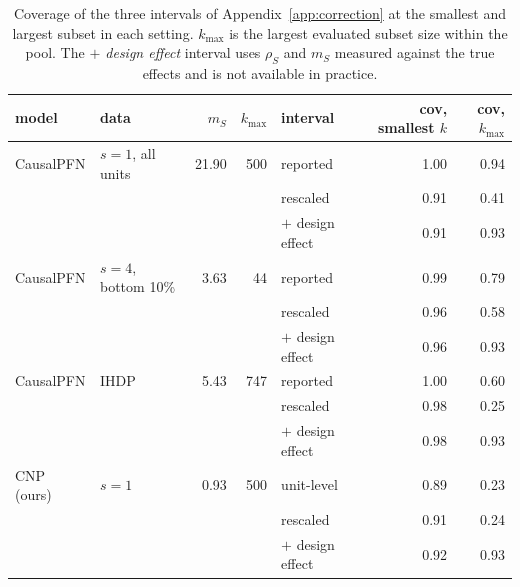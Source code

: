\begin{table}[tp]
\centering
\footnotesize
\setlength{\tabcolsep}{5pt}
\begin{tabular}{llrrlrr}
\toprule
\textbf{model} & \textbf{data} & \textbf{$m_S$} & \textbf{$k_{\max}$} & \textbf{interval} & \textbf{cov, smallest $k$} & \textbf{cov, $k_{\max}$} \\
\midrule
CausalPFN & $s=1$, all units & 21.90 & 500 & reported & 1.00 & 0.94 \\
 &  &  &  & rescaled & 0.91 & 0.41 \\
 &  &  &  & $+$ design effect & 0.91 & 0.93 \\
\addlinespace[2pt]
CausalPFN & $s=4$, bottom 10\% & 3.63 & 44 & reported & 0.99 & 0.79 \\
 &  &  &  & rescaled & 0.96 & 0.58 \\
 &  &  &  & $+$ design effect & 0.96 & 0.93 \\
\addlinespace[2pt]
CausalPFN & IHDP & 5.43 & 747 & reported & 1.00 & 0.60 \\
 &  &  &  & rescaled & 0.98 & 0.25 \\
 &  &  &  & $+$ design effect & 0.98 & 0.93 \\
\addlinespace[2pt]
CNP (ours) & $s=1$ & 0.93 & 500 & unit-level & 0.89 & 0.23 \\
 &  &  &  & rescaled & 0.91 & 0.24 \\
 &  &  &  & $+$ design effect & 0.92 & 0.93 \\
\bottomrule
\end{tabular}
\caption{Coverage of the three intervals of Appendix~\ref{app:correction} at the smallest and largest subset in each setting. $k_{\max}$ is the largest evaluated subset size within the pool. The \emph{$+$ design effect} interval uses $\rho_S$ and $m_S$ measured against the true effects and is not available in practice.}
\label{tab:threearm}
\end{table}
